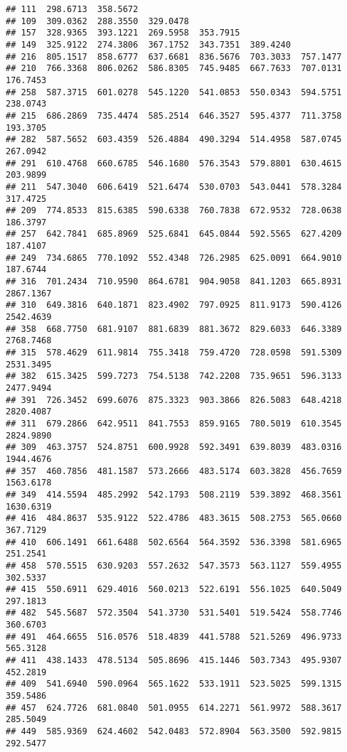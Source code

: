 \documentclass[
]{article}
\begin{document}
\begin{verbatim}
## 111  298.6713  358.5672                                                  
## 109  309.0362  288.3550  329.0478                                        
## 157  328.9365  393.1221  269.5958  353.7915                              
## 149  325.9122  274.3806  367.1752  343.7351  389.4240                    
## 216  805.1517  858.6777  637.6681  836.5676  703.3033  757.1477          
## 210  766.3368  806.0262  586.8305  745.9485  667.7633  707.0131  176.7453
## 258  587.3715  601.0278  545.1220  541.0853  550.0343  594.5751  238.0743
## 215  686.2869  735.4474  585.2514  646.3527  595.4377  711.3758  193.3705
## 282  587.5652  603.4359  526.4884  490.3294  514.4958  587.0745  267.0942
## 291  610.4768  660.6785  546.1680  576.3543  579.8801  630.4615  203.9899
## 211  547.3040  606.6419  521.6474  530.0703  543.0441  578.3284  317.4725
## 209  774.8533  815.6385  590.6338  760.7838  672.9532  728.0638  186.3797
## 257  642.7841  685.8969  525.6841  645.0844  592.5565  627.4209  187.4107
## 249  734.6865  770.1092  552.4348  726.2985  625.0091  664.9010  187.6744
## 316  701.2434  710.9590  864.6781  904.9058  841.1203  665.8931 2867.1367
## 310  649.3816  640.1871  823.4902  797.0925  811.9173  590.4126 2542.4639
## 358  668.7750  681.9107  881.6839  881.3672  829.6033  646.3389 2768.7468
## 315  578.4629  611.9814  755.3418  759.4720  728.0598  591.5309 2531.3495
## 382  615.3425  599.7273  754.5138  742.2208  735.9651  596.3133 2477.9494
## 391  726.3452  699.6076  875.3323  903.3866  826.5083  648.4218 2820.4087
## 311  679.2866  642.9511  841.7553  859.9165  780.5019  610.3545 2824.9890
## 309  463.3757  524.8751  600.9928  592.3491  639.8039  483.0316 1944.4676
## 357  460.7856  481.1587  573.2666  483.5174  603.3828  456.7659 1563.6178
## 349  414.5594  485.2992  542.1793  508.2119  539.3892  468.3561 1630.6319
## 416  484.8637  535.9122  522.4786  483.3615  508.2753  565.0660  367.7129
## 410  606.1491  661.6488  502.6564  564.3592  536.3398  581.6965  251.2541
## 458  570.5515  630.9203  557.2632  547.3573  563.1127  559.4955  302.5337
## 415  550.6911  629.4016  560.0213  522.6191  556.1025  640.5049  297.1813
## 482  545.5687  572.3504  541.3730  531.5401  519.5424  558.7746  360.6703
## 491  464.6655  516.0576  518.4839  441.5788  521.5269  496.9733  565.3128
## 411  438.1433  478.5134  505.8696  415.1446  503.7343  495.9307  452.2819
## 409  541.6940  590.0964  565.1622  533.1911  523.5025  599.1315  359.5486
## 457  624.7726  681.0840  501.0955  614.2271  561.9972  588.3617  285.5049
## 449  585.9369  624.4602  542.0483  572.8904  563.3500  592.9815  292.5477

\end{verbatim}
\end{document}
